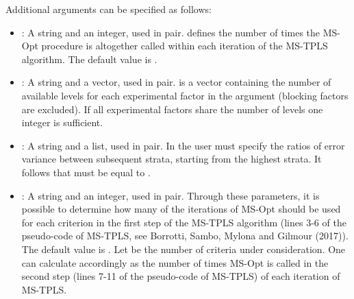 \documentclass[a4paper]{book}
\begin{document}
%
\begin{Details}\relax
Additional arguments can be specified as follows:
\begin{itemize}

\item{} : A string and an integer, used in pair. 
defines the number of times the MS-Opt procedure is altogether called within
each iteration of the MS-TPLS algorithm. The default value is .

\item{} : A string and a vector, used in pair. 
is a vector containing the number of available levels for each experimental
factor in the argument  (blocking factors are excluded). If all
experimental factors share the number of levels one integer is sufficient.

\item{} : A string and a list, used in pair. In 
the user must specify the ratios of error variance between subsequent strata,
starting from the highest strata. It follows that  must be
equal to .

\item{} : A string and an integer, used in pair. Through
these parameters, it is possible to determine how many of the  iterations
of MS-Opt should be used for each criterion in the first step of the MS-TPLS
algorithm (lines 3-6 of the pseudo-code of MS-TPLS, see Borrotti, Sambo, Mylona
and Gilmour (2017)). The default value is . Let  be
the number of criteria under consideration. One can calculate accordingly as
 the number of times MS-Opt is called in the
second step (lines 7-11 of the pseudo-code of MS-TPLS) of each iteration of MS-TPLS.

\end{itemize}

\end{Details}
%
\end{document}
